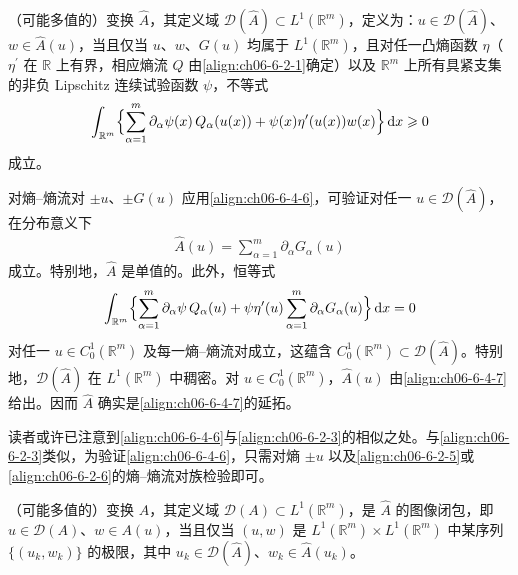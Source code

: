 \documentclass[../../main.tex]{subfiles}
\begin{document}
\begin{definition}\label{definition:ch06-6-4-1}
（可能多值的）变换 $\hat{A}$，其定义域 $\mathscr{D}(\hat{A})\subset L^{1}(\mathbb{R}^{m})$，定义为：$u\in\mathscr{D}(\hat{A})$、$w\in\hat{A}(u)$，当且仅当 $u$、$w$、$G(u)$ 均属于 $L^{1}(\mathbb{R}^{m})$，且对任一凸熵函数 $\eta$（$\eta^{\prime}$ 在 $\mathbb{R}$ 上有界，相应熵流 $Q$ 由\eqref{align:ch06-6-2-1}确定）以及 $\mathbb{R}^{m}$ 上所有具紧支集的非负 Lipschitz 连续试验函数 $\psi$，不等式
\begin{align}
\int_{\mathbb{R}^{m}}\Bigl{\{}\sum_{\alpha=1}^{m}\partial_{\alpha}\psi(x)\,Q_{\alpha}(u(x))+\psi(x)\eta^{\prime}(u(x))w(x)\Bigr{\}}\,\mathrm{d}x\geqslant 0
\label{align:ch06-6-4-6}
\end{align}
成立。
\end{definition}

对熵--熵流对 $\pm u$、$\pm G(u)$ 应用\eqref{align:ch06-6-4-6}，可验证对任一 $u\in\mathscr{D}(\hat{A})$，在分布意义下
\begin{align}
\hat{A}(u)=\sum_{\alpha=1}^{m}\partial_{\alpha}G_{\alpha}(u)
\label{align:ch06-6-4-7}
\end{align}
成立。特别地，$\hat{A}$ 是单值的。此外，恒等式
\begin{align}
\int_{\mathbb{R}^{m}}\Bigl{\{}\sum_{\alpha=1}^{m}\partial_{\alpha}\psi\,Q_{\alpha}(u)+\psi\eta^{\prime}(u)\sum_{\alpha=1}^{m}\partial_{\alpha}G_{\alpha}(u)\Bigr{\}}\,\mathrm{d}x=0
\label{align:ch06-6-4-8}
\end{align}
对任一 $u\in C_{0}^{1}(\mathbb{R}^{m})$ 及每一熵--熵流对成立，这蕴含 $C_{0}^{1}(\mathbb{R}^{m})\subset\mathscr{D}(\hat{A})$。特别地，$\mathscr{D}(\hat{A})$ 在 $L^{1}(\mathbb{R}^{m})$ 中稠密。对 $u\in C_{0}^{1}(\mathbb{R}^{m})$，$\hat{A}(u)$ 由\eqref{align:ch06-6-4-7}给出。因而 $\hat{A}$ 确实是\eqref{align:ch06-6-4-7}的延拓。

读者或许已注意到\eqref{align:ch06-6-4-6}与\eqref{align:ch06-6-2-3}的相似之处。与\eqref{align:ch06-6-2-3}类似，为验证\eqref{align:ch06-6-4-6}，只需对熵 $\pm u$ 以及\eqref{align:ch06-6-2-5}或\eqref{align:ch06-6-2-6}的熵--熵流对族检验即可。

\begin{definition}\label{definition:ch06-6-4-2}
（可能多值的）变换 $A$，其定义域 $\mathscr{D}(A)\subset L^{1}(\mathbb{R}^{m})$，是 $\hat{A}$ 的图像闭包，即 $u\in\mathscr{D}(A)$、$w\in A(u)$，当且仅当 $(u,w)$ 是 $L^{1}(\mathbb{R}^{m})\times L^{1}(\mathbb{R}^{m})$ 中某序列 $\{(u_{k},w_{k})\}$ 的极限，其中 $u_{k}\in\mathscr{D}(\hat{A})$、$w_{k}\in\hat{A}(u_{k})$。
\end{definition}
\end{document}
